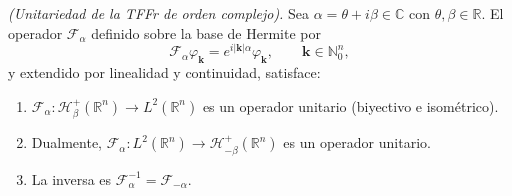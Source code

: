             \begin{theorem}\label{thm:isometriaComplejo}
                \textit{(Unitariedad de la TFFr de orden complejo).} Sea $\alpha = \theta+i\beta \in \mathbb{C}$ con $\theta,\beta\in\mathbb{R}$. El operador $\mathcal{F}_\alpha$ definido sobre la base de Hermite por
                \begin{equation}\label{eq:Cap2FalphaBase}
                    \mathcal{F}_\alpha \varphi_{\boldsymbol{k}} = e^{i|\boldsymbol{k}|\alpha}\varphi_{\boldsymbol{k}}, \qquad \boldsymbol{k}\in \mathbb{N}_0^n,
                \end{equation}
                y extendido por linealidad y continuidad, satisface:
                \begin{enumerate}
                    \item $\mathcal{F}_\alpha : \mathcal{H}_\beta^+(\mathbb{R}^n) \longrightarrow L^2(\mathbb{R}^n)$ es un operador unitario (biyectivo e isométrico).
                    \item Dualmente, $\mathcal{F}_\alpha : L^2(\mathbb{R}^n) \longrightarrow \mathcal{H}_{-\beta}^+(\mathbb{R}^n)$ es un operador unitario.
                    \item La inversa es $\mathcal{F}_\alpha^{-1} = \mathcal{F}_{-\alpha}$.
                \end{enumerate}
            \end{theorem}
